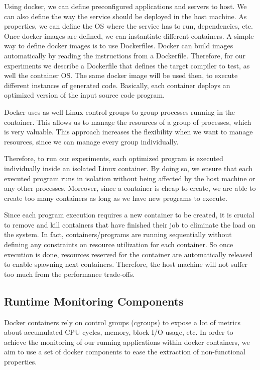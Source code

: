 Using docker, we can define preconfigured applications and servers to host. We can also define the way the service should be deployed in the host machine. 
As properties, we can define the OS where the service has to run, dependencies, etc. Once docker images are defined, we can instantiate different containers.
A simple way to define docker images is to use Dockerfiles. Docker can build images automatically by reading the instructions from a Dockerfile. 
Therefore, for our experiments we describe a Dockerfile that defines the target compiler to test, as well the container OS. The same docker image will be used then, to execute different instances of generated code. Basically, each container deploys an optimized version of the input source code program.

Docker uses as well Linux control groups to group processes running in the container. This allows us to manage the resources of a group of processes, which is very valuable. 
This approach increases the flexibility when we want to manage resources, since we can manage every group individually. 

Therefore, to run our experiments, each optimized program is executed individually inside an isolated Linux container. By doing so, we ensure that each executed program runs in isolation without being affected by the host machine or any other processes. Moreover, since a container is cheap to create, we are able to create too many containers as long as we have new programs to execute.

Since each program execution requires a new container to be created, it is crucial to remove and kill containers that have finished their job to eliminate the load on the system. In fact, containers/programs are running sequentially without defining any constraints on resource utilization for each container. So once execution is done, resources reserved for the container are automatically released to enable spawning next containers. Therefore, the host machine will not suffer too much from the performance trade-offs.

\subsection{Runtime Monitoring Components}

Docker containers rely on control groups (cgroups) to expose a lot of metrics about accumulated CPU cycles, memory, block I/O usage, etc. In order to achieve the monitoring of our running applications within docker containers, we aim to use a set of docker components to ease the extraction of non-functional properties.
